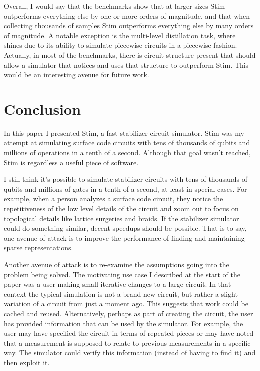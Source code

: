 \documentclass[onecolumn,unpublished]{quantumarticle}
\theoremstyle{definition}
\theoremstyle{definition}
\theoremstyle{definition}
\begin{document}
Overall, I would say that the benchmarks show that at larger sizes Stim outperforms everything else by one or more orders of magnitude, and that when collecting thousands of samples Stim outperforms everything else by many orders of magnitude.
A notable exception is the multi-level distillation task, where  shines due to its ability to simulate piecewise circuits in a piecewise fashion.
Actually, in most of the benchmarks, there is circuit structure present that should allow a simulator that notices and uses that structure to outperform Stim.
This would be an interesting avenue for future work.


\section{Conclusion}
\label{sec:conclusion}

In this paper I presented Stim, a fast stabilizer circuit simulator.
Stim was my attempt at simulating surface code circuits with tens of thousands of qubits and millions of operations in a tenth of a second.
Although that goal wasn't reached, Stim is regardless a useful piece of software.

I still think it's possible to simulate stabilizer circuits with tens of thousands of qubits and millions of gates in a tenth of a second, at least in special cases.
For example, when a person analyzes a surface code circuit, they notice the repetitiveness of the low level details of the circuit and zoom out to focus on topological details like lattice surgeries and braids.
If the stabilizer simulator could do something similar, decent speedups should be possible.
That is to say, one avenue of attack is to improve the performance of finding and maintaining sparse representations.

Another avenue of attack is to re-examine the assumptions going into the problem being solved.
The motivating use case I described at the start of the paper was a user making small iterative changes to a large circuit.
In that context the typical simulation is not a brand new circuit, but rather a slight variation of a circuit from just a moment ago.
This suggests that work could be cached and reused.
Alternatively, perhaps as part of creating the circuit, the user has provided information that can be used by the simulator.
For example, the user may have specified the circuit in terms of repeated pieces or may have noted that a measurement is supposed to relate to previous measurements in a specific way.
The simulator could verify this information (instead of having to find it) and then exploit it.
\end{document}
